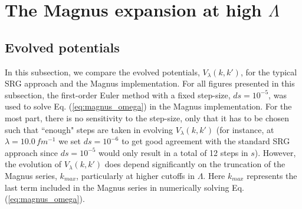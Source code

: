 \documentclass[preprintnumbers,floatfix,aps,prc,preprint]{revtex4-1}
\begin{document}
\section{The Magnus expansion at high $\Lambda$}
\label{sec:magnus_high_lambda}

\subsection{Evolved potentials}

In this subsection, we compare the evolved potentials, $V_{\lambda}(k,k')$, for the typical SRG approach and the Magnus implementation. For all figures presented in this subsection, the first-order Euler method with a fixed step-size, $ds=10^{-5}$, was used to solve Eq. (\ref{eq:magnus_omega}) in the Magnus implementation. For the most part, there is no sensitivity to the step-size, only that it has to be chosen such that ``enough" steps are taken in evolving $V_{\lambda}(k,k')$ (for instance, at $\lambda=10.0 \, fm^{-1}$ we set $ds=10^{-6}$ to get good agreement with the standard SRG approach since $ds=10^{-5}$ would only result in a total of 12 steps in $s$). However, the evolution of $V_{\lambda}(k,k')$ does depend significantly on the truncation of the Magnus series, $k_{max}$, particularly at higher cutoffs in $\Lambda$. Here $k_{max}$ represents the last term included in the Magnus series in numerically solving Eq. (\ref{eq:magnus_omega}).
%
\end{document}
